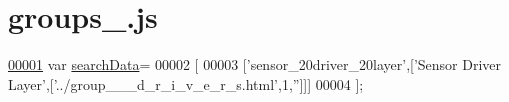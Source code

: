 \hypertarget{groups__0_8js_source}{}\section{groups\+\_.\+js}
\label{groups__0_8js_source}

\begin{DoxyCode}
\hypertarget{groups__0_8js_source.tex_l00001}{}\hyperlink{groups__0_8js_ad01a7523f103d6242ef9b0451861231e}{00001} var \hyperlink{groups__0_8js_ad01a7523f103d6242ef9b0451861231e}{searchData}=
00002 [
00003   [\textcolor{stringliteral}{'sensor\_20driver\_20layer'},[\textcolor{stringliteral}{'Sensor Driver Layer'},[\textcolor{stringliteral}{'../group\_\_\_d\_r\_i\_v\_e\_r\_s.html'},1,\textcolor{stringliteral}{''}]]]
00004 ];
\end{DoxyCode}
